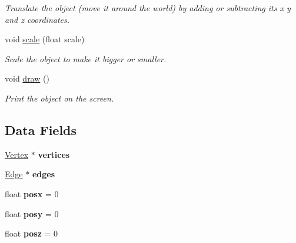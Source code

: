 \begin{DoxyCompactItemize}
\begin{DoxyCompactList}\small\item\em Translate the object (move it around the world) by adding or subtracting its x y and z coordinates. \end{DoxyCompactList}\item 
\hypertarget{classdriedobj_a30f12a90a332520104c379ca48ca5e55}{void \hyperlink{classdriedobj_a30f12a90a332520104c379ca48ca5e55}{scale} (float scale)}\label{classdriedobj_a30f12a90a332520104c379ca48ca5e55}

\begin{DoxyCompactList}\small\item\em Scale the object to make it bigger or smaller. \end{DoxyCompactList}\item 
\hypertarget{classdriedobj_a1ff67fb7a91ebaefbb5073d296411c3c}{void \hyperlink{classdriedobj_a1ff67fb7a91ebaefbb5073d296411c3c}{draw} ()}\label{classdriedobj_a1ff67fb7a91ebaefbb5073d296411c3c}

\begin{DoxyCompactList}\small\item\em Print the object on the screen. \end{DoxyCompactList}\end{DoxyCompactItemize}
\subsection*{Data Fields}
\begin{DoxyCompactItemize}
\item 
\hypertarget{classdriedobj_ae5abea12f7f59795493bd42f55e442e7}{\hyperlink{structVertex}{Vertex} $\ast$ {\bfseries vertices}}\label{classdriedobj_ae5abea12f7f59795493bd42f55e442e7}

\item 
\hypertarget{classdriedobj_aab0b19618c14ca7e61e93a30e82c2590}{\hyperlink{structEdge}{Edge} $\ast$ {\bfseries edges}}\label{classdriedobj_aab0b19618c14ca7e61e93a30e82c2590}

\item 
\hypertarget{classdriedobj_acb66bc6e8fe3ee3373def99fc42cb539}{float {\bfseries posx} = 0}\label{classdriedobj_acb66bc6e8fe3ee3373def99fc42cb539}

\item 
\hypertarget{classdriedobj_a584817574aee12a9cb8f0121a6da0fb6}{float {\bfseries posy} = 0}\label{classdriedobj_a584817574aee12a9cb8f0121a6da0fb6}

\item 
\hypertarget{classdriedobj_a67e851496be110d910d75e132f89a9e2}{float {\bfseries posz} = 0}\label{classdriedobj_a67e851496be110d910d75e132f89a9e2}

\end{DoxyCompactItemize}


